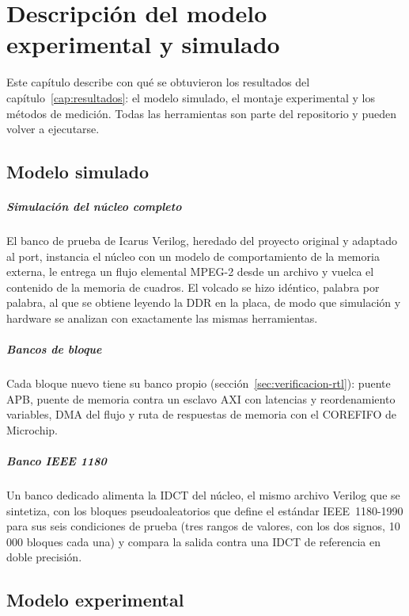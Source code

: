 \chapter{Descripción del modelo experimental y simulado}
\label{cap:modelo}

Este capítulo describe con qué se obtuvieron los resultados del
capítulo~\ref{cap:resultados}: el modelo simulado, el montaje experimental y
los métodos de medición. Todas las herramientas son parte del repositorio y
pueden volver a ejecutarse.

\section{Modelo simulado}
\label{sec:modelo-simulado}

\paragraph{Simulación del núcleo completo}
El banco de prueba de Icarus Verilog, heredado del proyecto original y
adaptado al port, instancia el núcleo con un modelo de comportamiento de la
memoria externa, le entrega un flujo elemental MPEG-2 desde un archivo y
vuelca el contenido de la memoria de cuadros. El volcado se hizo idéntico,
palabra por palabra, al que se obtiene leyendo la DDR en la placa, de modo
que simulación y hardware se analizan con exactamente las mismas
herramientas.

\paragraph{Bancos de bloque}
Cada bloque nuevo tiene su banco propio (sección~\ref{sec:verificacion-rtl}):
puente APB, puente de memoria contra un esclavo AXI con latencias y
reordenamiento variables, DMA del flujo y ruta de respuestas de memoria con
el COREFIFO de Microchip.

\paragraph{Banco IEEE 1180}
Un banco dedicado alimenta la IDCT del núcleo, el mismo archivo Verilog que
se sintetiza, con los bloques pseudoaleatorios que define el estándar
IEEE~1180-1990 para sus seis condiciones de prueba (tres rangos de valores,
con los dos signos, 10\,000 bloques cada una) y compara la salida contra una
IDCT de referencia en doble precisión.

\section{Modelo experimental}
\label{sec:modelo-experimental}

